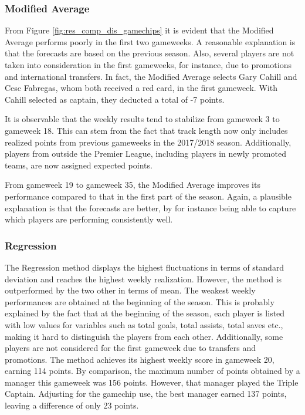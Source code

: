  

\subsubsection{Modified Average}

From Figure \ref{fig:res_comp_dis_gamechips} it is evident that the Modified Average performs poorly in the first two gameweeks. A reasonable explanation is that the forecasts are based on the previous season. Also, several players are not taken into consideration in the first gameweeks, for instance, due to promotions and international transfers. In fact, the Modified Average selects Gary Cahill and Cesc Fabregas, whom both received a red card, in the first gameweek. With Cahill selected as captain, they deducted a total of -7 points.

\newpar

It is observable that the weekly results tend to stabilize from gameweek 3 to gameweek 18. This can stem from the fact that track length now only includes realized points from previous gameweeks in the 2017/2018 season.  Additionally, players from outside the Premier League, including players in newly promoted teams, are now assigned expected points.

\newpar

From gameweek 19 to gameweek 35, the Modified Average improves its performance compared to that in the first part of the season. Again, a plausible explanation is that the forecasts are better, by for instance being able to capture which players are performing consistently well.


\subsubsection{Regression}


The Regression method displays the highest fluctuations in terms of standard deviation and reaches the highest weekly realization. However, the method is outperformed by the two other in terms of mean. The weakest weekly performances are obtained at the beginning of the season. This is probably explained by the fact that at the beginning of the season, each player is listed with low values for variables such as total goals, total assists, total saves etc., making it hard to distinguish the players from each other. Additionally, some players are not considered for the first gameweek due to transfers and promotions. The method achieves its highest weekly score in gameweek 20, earning 114 points. By comparison, the maximum number of points obtained by a manager this gameweek was 156 points. However, that manager played the Triple Captain. Adjusting for the gamechip use, the best manager earned 137 points, leaving a difference of only 23 points.

